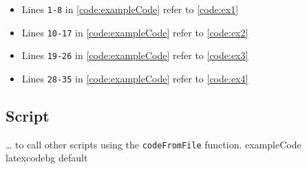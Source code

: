 \documentclass[../Dissertation]{subfiles}
\begin{document}
    \begin{itemize}
        \item Lines \texttt{1-8} in \cref{code:exampleCode} refer to
            \cref{code:ex1}
        \item Lines \texttt{10-17} in \cref{code:exampleCode} refer to
            \cref{code:ex2}
        \item Lines \texttt{19-26} in \cref{code:exampleCode} refer to
            \cref{code:ex3}
        \item Lines \texttt{28-35} in \cref{code:exampleCode} refer to
            \cref{code:ex4}
    \end{itemize}


\subsection{\texttt{} Script}
    {}
    {\ldots {} to call other scripts using the
    \texttt{codeFromFile} function.} %
    {exampleCode}
    {\footnotesize}
    {latexcodebg}
    {default}
\end{document}
